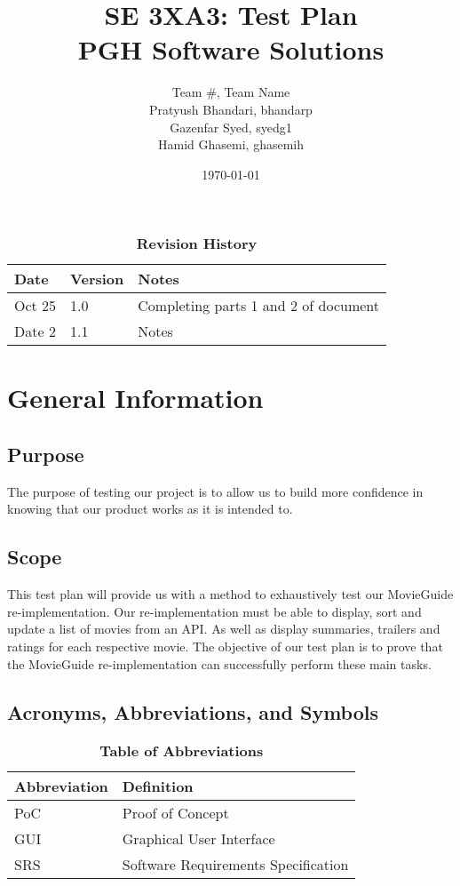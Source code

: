 \documentclass[12pt, titlepage]{article}
\title{SE 3XA3: Test Plan\\PGH Software Solutions}
\author{Team \#, Team Name
		\\ Pratyush Bhandari, bhandarp
		\\ Gazenfar Syed, syedg1
		\\ Hamid Ghasemi, ghasemih}
\date{\today}
\begin{document}
\maketitle

\tableofcontents
\listoftables
\listoffigures

\begin{table}[bp]
\caption{\bf Revision History}
\begin{tabularx}{\textwidth}{p{3cm}p{2cm}X}
\toprule {\bf Date} & {\bf Version} & {\bf Notes}\\
\midrule
Oct 25 & 1.0 & Completing parts 1 and 2 of document\\
Date 2 & 1.1 & Notes\\
\bottomrule
\end{tabularx}
\end{table}

\newpage



\section{General Information}

\subsection{Purpose}
The purpose of testing our project is to allow us to build more confidence in knowing that our product works as it is intended to.

\subsection{Scope}
This test plan will provide us with a method to exhaustively test our MovieGuide re-implementation. Our re-implementation must be able to display, sort and update a list of movies from an API. As well as display summaries, trailers and ratings for each respective movie. The objective of our test plan is to prove that the MovieGuide re-implementation can successfully perform these main tasks. 


\subsection{Acronyms, Abbreviations, and Symbols}
	
\begin{table}[hbp]
\caption{\textbf{Table of Abbreviations}} \label{Table}

\begin{tabularx}{\textwidth}{p{3cm}X}
\toprule
\textbf{Abbreviation} & \textbf{Definition} \\
\midrule
PoC & Proof of Concept\\
GUI & Graphical User Interface\\
SRS & Software Requirements Specification\\
\bottomrule
\end{tabularx}

\end{table}
\end{document}
